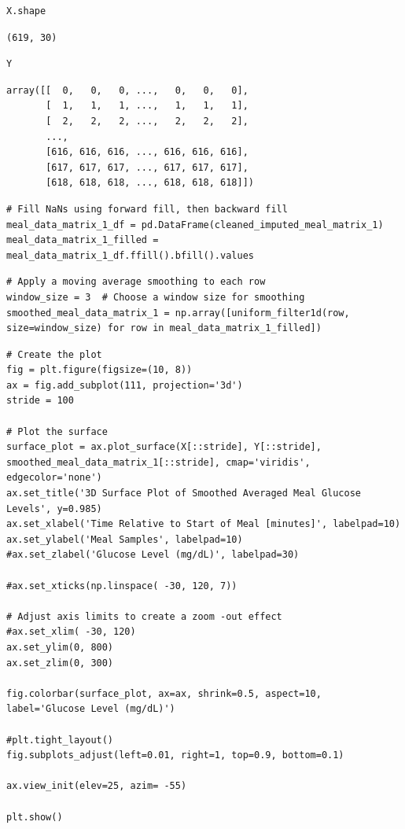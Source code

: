 \begin{verbatim}
X.shape
\end{verbatim}

\begin{verbatim}
(619, 30)
\end{verbatim}

\begin{verbatim}
Y
\end{verbatim}

\begin{verbatim}
array([[  0,   0,   0, ...,   0,   0,   0],
       [  1,   1,   1, ...,   1,   1,   1],
       [  2,   2,   2, ...,   2,   2,   2],
       ...,
       [616, 616, 616, ..., 616, 616, 616],
       [617, 617, 617, ..., 617, 617, 617],
       [618, 618, 618, ..., 618, 618, 618]])
\end{verbatim}

\begin{verbatim}
# Fill NaNs using forward fill, then backward fill
meal_data_matrix_1_df = pd.DataFrame(cleaned_imputed_meal_matrix_1)
meal_data_matrix_1_filled = meal_data_matrix_1_df.ffill().bfill().values
\end{verbatim}

\begin{verbatim}
# Apply a moving average smoothing to each row
window_size = 3  # Choose a window size for smoothing
smoothed_meal_data_matrix_1 = np.array([uniform_filter1d(row, size=window_size) for row in meal_data_matrix_1_filled])
\end{verbatim}

\begin{verbatim}
# Create the plot
fig = plt.figure(figsize=(10, 8))
ax = fig.add_subplot(111, projection='3d')
stride = 100

# Plot the surface
surface_plot = ax.plot_surface(X[::stride], Y[::stride], smoothed_meal_data_matrix_1[::stride], cmap='viridis', edgecolor='none')
ax.set_title('3D Surface Plot of Smoothed Averaged Meal Glucose Levels', y=0.985)
ax.set_xlabel('Time Relative to Start of Meal [minutes]', labelpad=10)
ax.set_ylabel('Meal Samples', labelpad=10)
#ax.set_zlabel('Glucose Level (mg/dL)', labelpad=30)

#ax.set_xticks(np.linspace( -30, 120, 7))

# Adjust axis limits to create a zoom -out effect
#ax.set_xlim( -30, 120)
ax.set_ylim(0, 800)
ax.set_zlim(0, 300)

fig.colorbar(surface_plot, ax=ax, shrink=0.5, aspect=10, label='Glucose Level (mg/dL)')

#plt.tight_layout()
fig.subplots_adjust(left=0.01, right=1, top=0.9, bottom=0.1)

ax.view_init(elev=25, azim= -55)

plt.show()
\end{verbatim}

